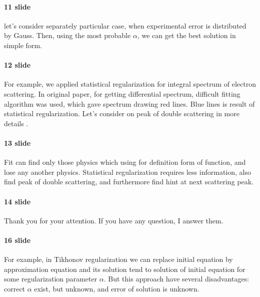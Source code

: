 \documentclass[a4paper]{article}
\begin{document}
\paragraph{11 slide}   
let's consider separately particular case, when experimental error is distributed by Gauss. Then, using  the most probable $\alpha$, we can get the best solution in simple form.
\paragraph{12 slide}   
For example, we applied statistical regularization for integral spectrum of electron scattering. In original paper, for getting differential spectrum, difficult fitting algorithm was used, which gave spectrum drawing red lines.  Blue lines is result of statistical regularization. Let's consider on peak of double scattering in more details .
\paragraph{13 slide} 
Fit can find only those physics which using for definition form of function, and lose any another physics. Statistical regularization requires less information, also find peak of double scattering, and furthermore find hint at next scattering peak.
\paragraph{14 slide}
Thank you for your attention. If you have any question, I answer them.
\paragraph{16 slide}       
For example, in Tikhonov regularization we can replace initial equation by approximation equation and its solution tend to solution of initial equation for some regularization parameter  $\alpha$. But this approach have several disadvantages: correct $\alpha$ exist, but unknown, and error of solution is unknown.
\end{document}
